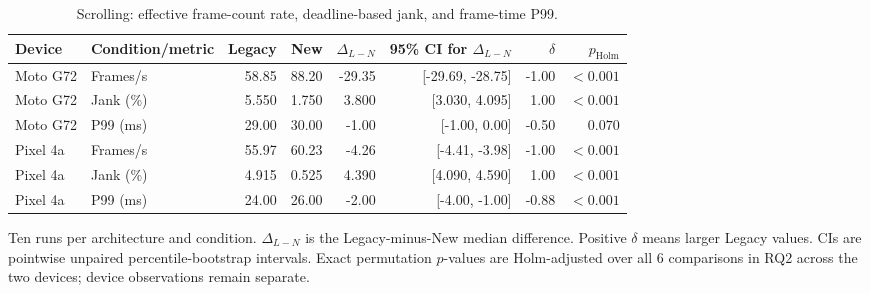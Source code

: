 \begin{table}[!t]
\centering
\caption{Scrolling: effective frame-count rate, deadline-based jank, and frame-time P99.}
\label{tab:s2}
\small\setlength{\tabcolsep}{5pt}
\begin{tabular}{llrrrrrr}
\toprule
Device & Condition/metric & Legacy & New & $\Delta_{L-N}$ & 95\% CI for $\Delta_{L-N}$ & $\delta$ & $p_{\mathrm{Holm}}$ \\
\midrule
Moto G72 & Frames/s & 58.85 & 88.20 & -29.35 & [-29.69, -28.75] & -1.00 & $<0.001$ \\
Moto G72 & Jank (\%) & 5.550 & 1.750 & 3.800 & [3.030, 4.095] & 1.00 & $<0.001$ \\
Moto G72 & P99 (ms) & 29.00 & 30.00 & -1.00 & [-1.00, 0.00] & -0.50 & $0.070$ \\
Pixel 4a & Frames/s & 55.97 & 60.23 & -4.26 & [-4.41, -3.98] & -1.00 & $<0.001$ \\
Pixel 4a & Jank (\%) & 4.915 & 0.525 & 4.390 & [4.090, 4.590] & 1.00 & $<0.001$ \\
Pixel 4a & P99 (ms) & 24.00 & 26.00 & -2.00 & [-4.00, -1.00] & -0.88 & $<0.001$ \\
\bottomrule
\end{tabular}
\par\smallskip
\begin{minipage}{0.98\textwidth}\footnotesize
Ten runs per architecture and condition. $\Delta_{L-N}$ is the Legacy-minus-New median difference. Positive $\delta$ means larger Legacy values. CIs are pointwise unpaired percentile-bootstrap intervals. Exact permutation $p$-values are Holm-adjusted over all 6 comparisons in RQ2 across the two devices; device observations remain separate.
\end{minipage}
\end{table}
